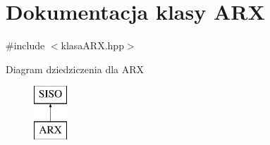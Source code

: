 \hypertarget{class_a_r_x}{\section{Dokumentacja klasy A\-R\-X}
\label{class_a_r_x}
}


{\ttfamily \#include $<$klasa\-A\-R\-X.\-hpp$>$}

Diagram dziedziczenia dla A\-R\-X\begin{figure}[H]
\begin{center}
\leavevmode
\includegraphics[height=2.000000cm]{class_a_r_x}
\end{center}
\end{figure}
